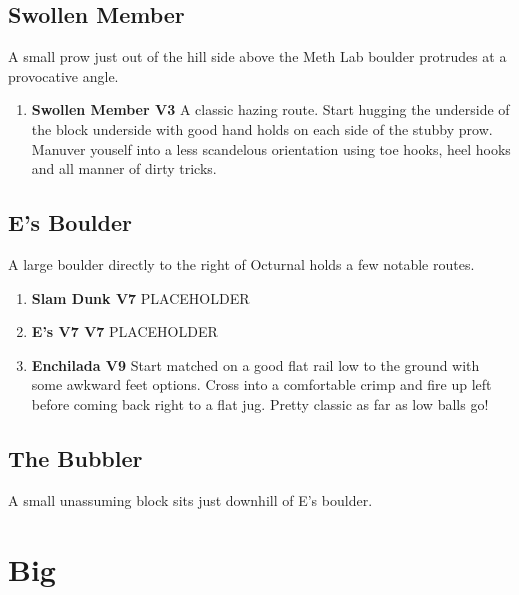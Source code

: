 \subsection*{Swollen Member}\label{bf:Swollen Member}
A small prow just out of the hill side above the Meth Lab boulder protrudes at a provocative angle.

\begin{enumerate}[resume]
	\item\label{rt:Swollen Member} \colorbox{green!20}{\textbf{Swollen Member V3     } }
	\newline A classic hazing route. Start hugging the underside of the block underside with good hand holds on each side of the stubby prow. Manuver youself into a less scandelous orientation using toe hooks, heel hooks and  all manner of dirty tricks.\
\end{enumerate}
\subsection*{E's Boulder}\label{bf:E's Boulder}
A large boulder directly to the right of Octurnal holds a few notable routes.

\begin{enumerate}[resume]
	\item\label{rt:Slam Dunk} \colorbox{Goldenrod!50}{\textbf{Slam Dunk V7  } }
	\newline PLACEHOLDER\
	\item\label{rt:E's V7} \colorbox{Goldenrod!50}{\textbf{E's V7 V7  } }
	\newline PLACEHOLDER\
	\item\label{rt:Enchilada} \colorbox{Goldenrod!50}{\textbf{Enchilada V9     } }
	\newline Start matched on a good flat rail low to the ground with some awkward feet options. Cross into a comfortable crimp and fire up left before coming back right to a flat jug. Pretty classic as far as low balls go!\
\end{enumerate}
\subsection*{The Bubbler}\label{bf:The Bubbler}
A small unassuming block sits just downhill of E's boulder.

\section{Big}\label{sa:Big}
\

